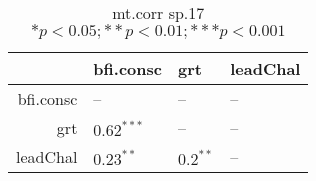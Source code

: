 \begin{table}[ht]
\centering
\begin{tabular}{rlll}
  \hline
 & bfi.consc & grt & leadChal \\ 
  \hline
bfi.consc & -- & -- & -- \\ 
  grt & $0.62^{***}$ & -- & -- \\ 
  leadChal & $0.23^{**}$ & $0.2^{**}$ & -- \\ 
   \hline
\end{tabular}
\caption{mt.corr sp.17 $* p < 0.05; ** p < 0.01; *** p < 0.001$} 
\label{freq_corr.mt.corr.sp.17}
\end{table}
